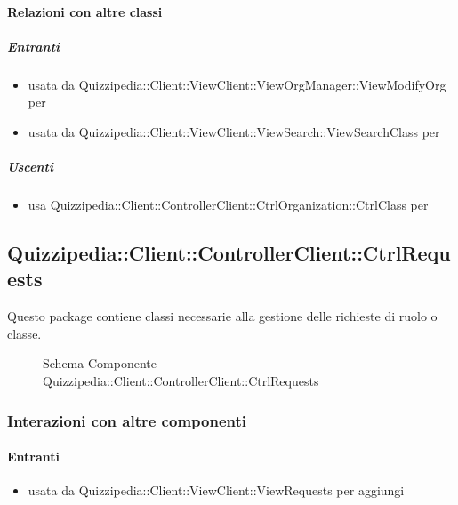 \paragraph{Relazioni con altre classi}
\subparagraph{Entranti}
\begin{itemize}
\item usata da Quizzipedia::Client::ViewClient::ViewOrgManager::ViewModifyOrg per 
\item usata da Quizzipedia::Client::ViewClient::ViewSearch::ViewSearchClass per 
\end{itemize}
\subparagraph{Uscenti}
\begin{itemize}
\item usa Quizzipedia::Client::ControllerClient::CtrlOrganization::CtrlClass per 
\end{itemize}
\subsection{Quizzipedia::Client::ControllerClient::CtrlRequests}
Questo package contiene classi necessarie alla gestione delle richieste di ruolo o classe.
\begin{figure}[H]
\centering
\noindent{}
\caption[Schema Componente Quizzipedia::Client::ControllerClient::CtrlRequests]{Schema Componente Quizzipedia::Client::ControllerClient::CtrlRequests}
\end{figure}
\subsubsection{Interazioni con altre componenti}
\paragraph{Entranti}
\begin{itemize}
\item usata da Quizzipedia::Client::ViewClient::ViewRequests per aggiungi
\end{itemize}
